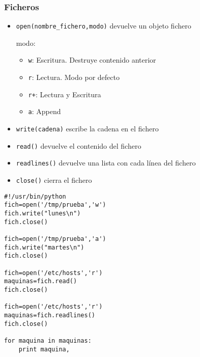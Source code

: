 \begin{frame}[fragile]
\frametitle{Ficheros}
\begin{itemize}
  
\item \verb|open(nombre_fichero,modo)| devuelve un objeto fichero

modo:
\begin{itemize}
  
\item \verb|w|: Escritura. Destruye contenido anterior
\item \verb|r|: Lectura. Modo por defecto
\item \verb|r+|: Lectura y Escritura
\item \verb|a|: Append

\end{itemize}

\item \verb|write(cadena)| escribe la cadena en el fichero  
\item \verb|read()| devuelve el contenido del fichero
\item \verb|readlines()| devuelve una lista con cada línea del fichero
\item \verb|close()| cierra el fichero

\end{itemize}
\end{frame}


\begin{frame}[fragile]

\begin{footnotesize}
\begin{verbatim}
#!/usr/bin/python
fich=open('/tmp/prueba','w')
fich.write("lunes\n")
fich.close()

fich=open('/tmp/prueba','a')
fich.write("martes\n")
fich.close()

fich=open('/etc/hosts','r')
maquinas=fich.read()
fich.close()

fich=open('/etc/hosts','r')
maquinas=fich.readlines()
fich.close()

for maquina in maquinas:
    print maquina,

\end{verbatim}
\end{footnotesize}
\end{frame}



